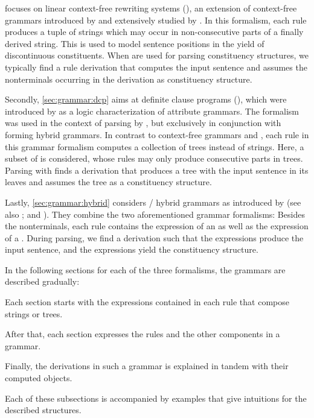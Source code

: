 \documentclass[../document.tex]{subfiles}
\begin{document}
     focuses on linear context-free rewriting systems (), an extension of context-free grammars introduced by \citet{VijWeiJos87} and extensively studied by \citet{SekMatFujKas91}.
    In this formalism, each rule produces a tuple of strings which may occur in non-consecutive parts of a finally derived string.
    This is used to model sentence positions in the yield of discontinuous constituents.
    When  are used for parsing constituency structures, we typically find a rule derivation that computes the input sentence and assumes the nonterminals occurring in the derivation as constituency structure.

    Secondly, \cref{sec:grammar:dcp} aims at definite clause programs (), which were introduced by \citet{Der85} as a logic characterization of attribute grammars.
    The formalism was used in the context of parsing by \citet{Ned14}, but exclusively in conjunction with  forming hybrid grammars.
    In contrast to context-free grammars and , each rule in this grammar formalism computes a collection of trees instead of strings.
    Here, a subset of  is considered, whose rules may only produce consecutive parts in trees.
    Parsing with  finds a derivation that produces a tree with the input sentence in its leaves and assumes the tree as a constituency structure.

    Lastly, \cref{sec:grammar:hybrid} considers / hybrid grammars as introduced by \citet{Ned14} (see also \citealp{Geb17}; and \citep{Geb20}).
    They combine the two aforementioned grammar formalisms:
        Besides the nonterminals, each rule contains the expression of an  as well as the expression of a .
    During parsing, we find a derivation such that the  expressions produce the input sentence, and the  expressions yield the constituency structure.

    In the following sections for each of the three formalisms, the grammars are described gradually:
    \begin{inparaenum}
        \item Each section starts with the expressions contained in each rule that compose strings or trees.
        \item After that, each section expresses the rules and the other components in a grammar.
        \item Finally, the derivations in such a grammar is explained in tandem with their computed objects.
    \end{inparaenum}
    Each of these subsections is accompanied by examples that give intuitions for the described structures.

    
    
    

    \ifSubfilesClassLoaded{%
        \printindex
    }{}
\end{document}
